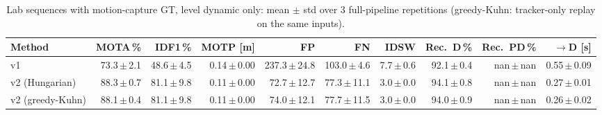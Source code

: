 \begin{table}[t]
\centering
\caption{Lab sequences with motion-capture GT, level dynamic only: mean $\pm$ std over 3 full-pipeline repetitions (greedy-Kuhn: tracker-only replay on the same inputs).}
\label{tab:own_r8_dynamic_only_reps}
\setlength{\tabcolsep}{3pt}
\begin{tabular}{lrrrrrrrrr}
\toprule
Method & MOTA\,\% & IDF1\,\% & MOTP [m] & FP & FN & IDSW & Rec.\ D\,\% & Rec.\ PD\,\% & $\to$D [s] \\
\midrule
v1 & 73.3\,$\pm$\,2.1 & 48.6\,$\pm$\,4.5 & 0.14\,$\pm$\,0.00 & 237.3\,$\pm$\,24.8 & 103.0\,$\pm$\,4.6 & 7.7\,$\pm$\,0.6 & 92.1\,$\pm$\,0.4 & nan\,$\pm$\,nan & 0.55\,$\pm$\,0.09 \\
v2 (Hungarian) & 88.3\,$\pm$\,0.7 & 81.1\,$\pm$\,9.8 & 0.11\,$\pm$\,0.00 & 72.7\,$\pm$\,12.7 & 77.3\,$\pm$\,11.1 & 3.0\,$\pm$\,0.0 & 94.1\,$\pm$\,0.8 & nan\,$\pm$\,nan & 0.27\,$\pm$\,0.01 \\
v2 (greedy-Kuhn) & 88.1\,$\pm$\,0.4 & 81.1\,$\pm$\,9.8 & 0.11\,$\pm$\,0.00 & 74.0\,$\pm$\,12.1 & 77.7\,$\pm$\,11.5 & 3.0\,$\pm$\,0.0 & 94.0\,$\pm$\,0.9 & nan\,$\pm$\,nan & 0.26\,$\pm$\,0.02 \\
\bottomrule
\end{tabular}
\end{table}
